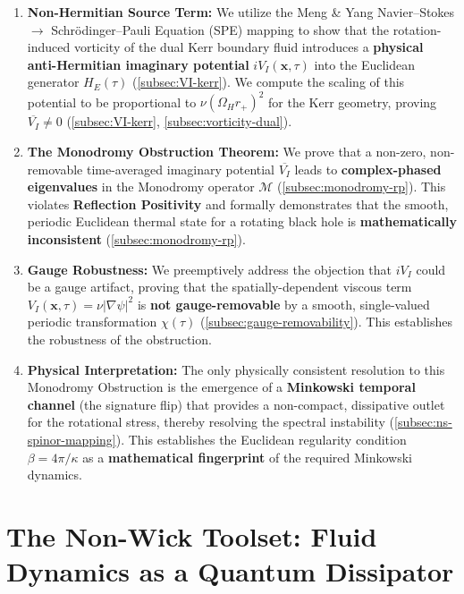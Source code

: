 \documentclass[11pt]{article}
\begin{document}
\begin{enumerate}
    \item \textbf{Non-Hermitian Source Term:} We utilize the Meng \& Yang Navier–Stokes $\to$ Schr\"odinger–Pauli Equation (SPE) mapping \cite{MengYang2024} to show that the rotation-induced vorticity of the dual Kerr boundary fluid introduces a \textbf{physical anti-Hermitian imaginary potential} $iV_I(\mathbf{x}, \tau)$ into the Euclidean generator $H_E(\tau)$ (\autoref{subsec:VI-kerr}). We compute the scaling of this potential to be proportional to $\nu(\Omega_H r_+)^2$ for the Kerr geometry, proving $\overline{V_I} \neq 0$ (\autoref{subsec:VI-kerr}, \autoref{subsec:vorticity-dual}).

   \item \textbf{The Monodromy Obstruction Theorem:} We prove that a non-zero, non-removable time-averaged imaginary potential $\overline{V_I}$ leads to \textbf{complex-phased eigenvalues} in the Monodromy operator $\mathcal{M}$ (\autoref{subsec:monodromy-rp}). This violates \textbf{Reflection Positivity\cite{OsterwalderSchrader1973}} and formally demonstrates that the smooth, periodic Euclidean thermal state for a rotating black hole is \textbf{mathematically inconsistent} (\autoref{subsec:monodromy-rp}).

    \item \textbf{Gauge Robustness:} We preemptively address the objection that $iV_I$ could be a gauge artifact, proving that the spatially-dependent viscous term $V_I(\mathbf{x}, \tau) = \nu|\nabla\psi|^2$ is \textbf{not gauge-removable} by a smooth, single-valued periodic transformation $\chi(\tau)$ (\autoref{subsec:gauge-removability}). This establishes the robustness of the obstruction.

    \item \textbf{Physical Interpretation:} The only physically consistent resolution to this Monodromy Obstruction is the emergence of a \textbf{Minkowski temporal channel} (the signature flip) that provides a non-compact, dissipative outlet for the rotational stress, thereby resolving the spectral instability (\autoref{subsec:ns-spinor-mapping}). This establishes the Euclidean regularity condition $\beta = 4\pi/\kappa$ \cite{GibbonsHawking1977} as a \textbf{mathematical fingerprint} of the required Minkowski dynamics.
\end{enumerate}
\section{The Non-Wick Toolset: Fluid Dynamics as a Quantum Dissipator}
\end{document}
